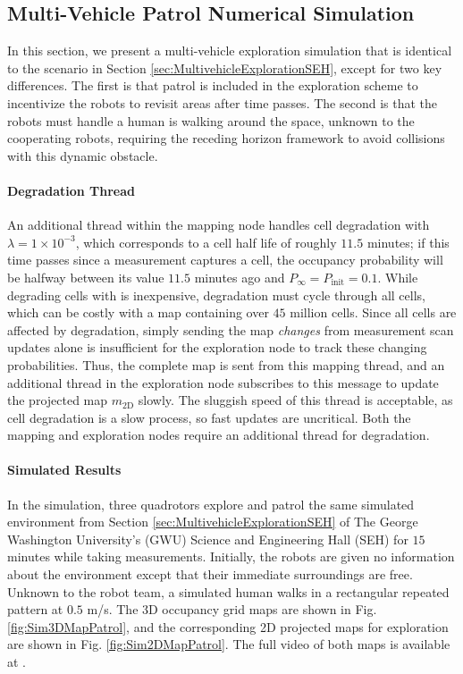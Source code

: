 \subsection{Multi-Vehicle Patrol Numerical Simulation}
\label{sec:MultivehiclePatrolSEH}



In this section, we present a multi-vehicle exploration simulation that is identical to the scenario in Section \ref{sec:MultivehicleExplorationSEH}, except for two key differences. The first is that patrol is included in the exploration scheme to incentivize the robots to revisit areas after time passes. The second is that the robots must handle a human is walking around the space, unknown to the cooperating robots, requiring the receding horizon framework to avoid collisions with this dynamic obstacle.

\paragraph{Degradation Thread}
An additional thread within the mapping node handles cell degradation with $\lambda=1\times10^{-3}$, which corresponds to a cell half life of roughly $11.5$ minutes; if this time passes since a measurement captures a cell, the occupancy probability will be halfway between its value $11.5$ minutes ago and $P_\infty=P_\text{init}=0.1$. While degrading cells with  is inexpensive, degradation must cycle through all cells, which can be costly with a map containing over $45$ million cells. Since all cells are affected by degradation, simply sending the map \emph{changes} from measurement scan updates alone is insufficient for the exploration node to track these changing probabilities. Thus, the complete map is sent from this mapping thread, and an additional thread in the exploration node subscribes to this message to update the projected map $m_\text{2D}$ slowly. The sluggish speed of this thread is acceptable, as cell degradation is a slow process, so fast updates are uncritical. Both the mapping and exploration nodes require an additional thread for degradation.


\paragraph{Simulated Results}

In the simulation, three quadrotors explore and patrol the same simulated environment from Section \ref{sec:MultivehicleExplorationSEH} of The George Washington University's (GWU) Science and Engineering Hall (SEH) for $15$ minutes while taking measurements. Initially, the robots are given no information about the environment except that their immediate surroundings are free. Unknown to the robot team, a simulated human walks in a rectangular repeated pattern at $0.5$ m/s. The 3D occupancy grid maps are shown in Fig. \ref{fig:Sim3DMapPatrol}, and the corresponding 2D projected maps for exploration are shown in Fig. \ref{fig:Sim2DMapPatrol}. The full video of both maps is available at \href{https://youtu.be/bsLG2romP_8}{}.




